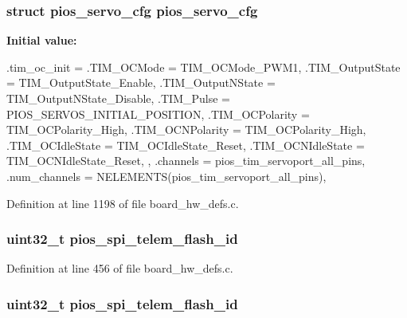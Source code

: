 \hypertarget{group___revo_mini_ga57a87ef16d7949a9cc3589efc8d88a28}{
\subsubsection[{pios\-\_\-servo\-\_\-cfg}]{\setlength{\rightskip}{0pt plus 5cm}struct {\bf pios\-\_\-servo\-\_\-cfg} {\bf pios\-\_\-servo\-\_\-cfg}}}\label{group___revo_mini_ga57a87ef16d7949a9cc3589efc8d88a28}
{\bfseries \-Initial value\-:}
\begin{DoxyCode}
 {
        .tim_oc_init = {
                .TIM_OCMode = TIM_OCMode_PWM1,
                .TIM_OutputState = TIM_OutputState_Enable,
                .TIM_OutputNState = TIM_OutputNState_Disable,
                .TIM_Pulse = PIOS_SERVOS_INITIAL_POSITION,
                .TIM_OCPolarity = TIM_OCPolarity_High,
                .TIM_OCNPolarity = TIM_OCPolarity_High,
                .TIM_OCIdleState = TIM_OCIdleState_Reset,
                .TIM_OCNIdleState = TIM_OCNIdleState_Reset,
        },
        .channels = pios_tim_servoport_all_pins,
        .num_channels = NELEMENTS(pios_tim_servoport_all_pins),
}
\end{DoxyCode}


\-Definition at line 1198 of file board\-\_\-hw\-\_\-defs.\-c.

\hypertarget{group___revo_mini_gabcea731eedc7b51eae0e4074e35fc8c1}{
\subsubsection[{pios\-\_\-spi\-\_\-telem\-\_\-flash\-\_\-id}]{\setlength{\rightskip}{0pt plus 5cm}uint32\-\_\-t {\bf pios\-\_\-spi\-\_\-telem\-\_\-flash\-\_\-id}}}\label{group___revo_mini_gabcea731eedc7b51eae0e4074e35fc8c1}


\-Definition at line 456 of file board\-\_\-hw\-\_\-defs.\-c.

\hypertarget{group___revo_mini_gabcea731eedc7b51eae0e4074e35fc8c1}{
\subsubsection[{pios\-\_\-spi\-\_\-telem\-\_\-flash\-\_\-id}]{\setlength{\rightskip}{0pt plus 5cm}uint32\-\_\-t {\bf pios\-\_\-spi\-\_\-telem\-\_\-flash\-\_\-id}}}\label{group___revo_mini_gabcea731eedc7b51eae0e4074e35fc8c1}


